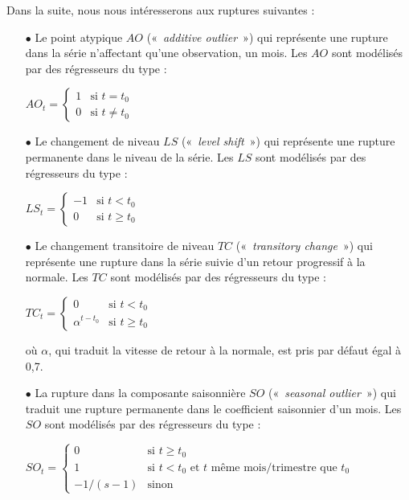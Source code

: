 \documentclass[12pt, a4paper, french]{article}
\begin{document}
Dans la suite, nous nous intéresserons aux ruptures suivantes :
\begin{itemize}
	\item[$\bullet$] Le point atypique $AO$ («~\emph{additive outlier}~») qui représente une rupture dans la série n'affectant qu'une observation, un mois. Les $AO$ sont modélisés par des régresseurs du type : 
	
$
AO_{t} = \left\{ \begin{array}{cl} 
                1 & \mbox{si } t=t_{0} \\
                0 & \mbox{si } t\neq t_{0}
               \end{array}
       \right.
$
	\item[$\bullet$] Le changement de niveau $LS$ («~\emph{level shift}~») qui représente une rupture permanente dans le niveau de la série. Les $LS$ sont modélisés par des régresseurs du type : 
	
$
LS_{t} = \left\{ \begin{array}{rl} 
                -1 & \mbox{si } t<t_{0} \\
                0 & \mbox{si } t\geq t_{0}
               \end{array}
       \right.
$
	\item[$\bullet$] Le changement transitoire de niveau $TC$ («~\emph{transitory change}~») qui représente une rupture dans la série suivie d'un retour progressif à la normale. Les $TC$ sont modélisés par des régresseurs du type : 
	
$
TC_{t} = \left\{ \begin{array}{cl} 
                0 & \mbox{si } t<t_{0} \\
                \alpha^{t-t_{0}} & \mbox{si } t \geq t_{0}
               \end{array}
       \right.
$

où $\alpha$, qui traduit la vitesse de retour à la normale, est pris par défaut égal à 0,7.
	\item[$\bullet$] La rupture dans la composante saisonnière $SO$ («~\emph{seasonal outlier}~») qui traduit une rupture permanente dans le coefficient saisonnier d'un mois. Les $SO$ sont modélisés par des régresseurs du type : 
	
$			
SO_{t} = \left\{ \begin{array}{cl} 
                0 & \mbox{si } t \geq t_{0} \\
								1 & \mbox{si } t < t_{0} \mbox{ et } t  \mbox{ même mois/trimestre que } t_{0}\\
                -1/(s-1) & \mbox{sinon }
               \end{array}
       \right.		
$
\end{itemize}
\end{document}
